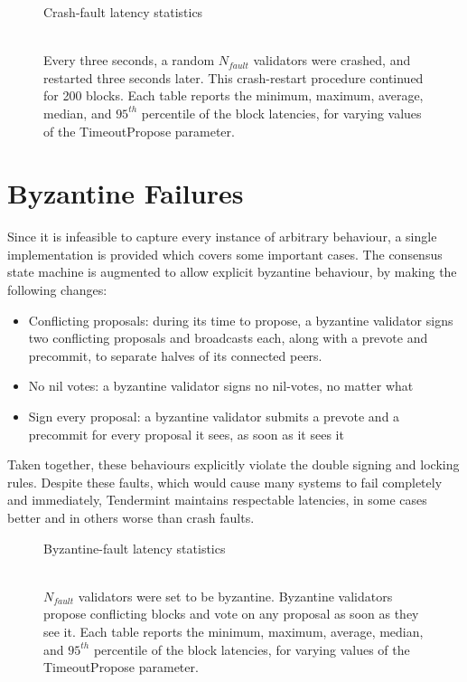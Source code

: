 \begin{figure}[]
	Crash-fault latency statistics	\\\\
	
	\caption[Latency statistics under crash faults]{Every three seconds, a random $N_{fault}$ validators were crashed, and restarted three seconds later. This crash-restart procedure continued for 200 blocks. Each table reports the minimum, maximum, average, median, and $95^{th}$ percentile of the block latencies, for varying values of the TimeoutPropose parameter.}
	\label{fig:exp:crash_failure}
\end{figure}


\section{Byzantine Failures}

Since it is infeasible to capture every instance of arbitrary behaviour,
a single implementation is provided which covers some important cases.
The consensus state machine is augmented to allow explicit byzantine behaviour,
by making the following changes:

\begin{itemize}
\item{Conflicting proposals: during its time to propose, a byzantine validator signs two conflicting proposals and broadcasts each, along with a prevote and precommit, to separate halves of its connected peers.} 
\item{No nil votes: a byzantine validator signs no nil-votes, no matter what}
\item{Sign every proposal: a byzantine validator submits a prevote and a precommit for every proposal it sees, as soon as it sees it}
\end{itemize}

Taken together, these behaviours explicitly violate the double signing and locking rules. 
Despite these faults, which would cause many systems to fail completely and immediately,
Tendermint maintains respectable latencies, in some cases better and in others worse than crash faults.

\begin{figure}[]
	Byzantine-fault latency statistics \\\\
	
	\caption[Latency statistics under byzantine faults]{$N_{fault}$ validators were set to be byzantine.
Byzantine validators propose conflicting blocks and vote on any proposal as soon as they see it.
Each table reports the minimum, maximum, average, median, and $95^{th}$ percentile of the block latencies, for varying values of the TimeoutPropose parameter.}
	\label{fig:exp:byz_failure}
\end{figure}




